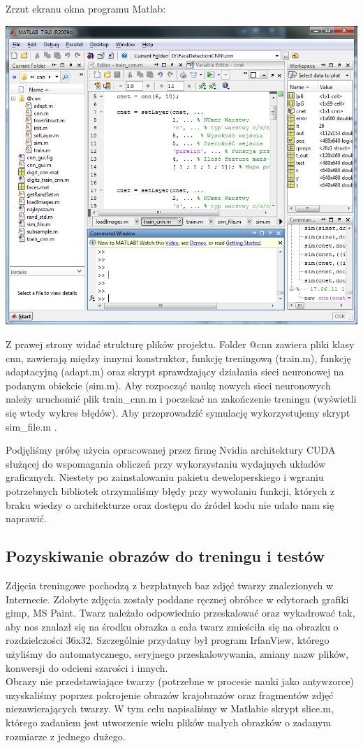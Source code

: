 \documentclass[11pt,a4paper]{article}
\begin{document}
Zrzut ekranu okna programu Matlab:

\vspace*{0.5cm}
\includegraphics[scale=0.5]{matlab}
\vspace*{0.5cm}

Z prawej strony widać strukturę plików projektu. Folder @cnn zawiera pliki klasy cnn, zawierają między innymi konstruktor, funkcję treningową (train.m), funkcję adaptacyjną (adapt.m) oraz skrypt sprawdzający działania sieci neuronowej na podanym obiekcie (sim.m).
\indent
Aby rozpocząć naukę nowych sieci neuronowych należy uruchomić plik train\_cnn.m i poczekać na zakończenie treningu (wyświetli się wtedy wykres błędów). Aby przeprowadzić symulację wykorzystujemy skrypt sim\_file.m .

Podjęliśmy próbę użycia opracowanej przez firmę Nvidia architektury CUDA służącej do wspomagania obliczeń przy wykorzystaniu wydajnych układów graficznych. Niestety po zainstalowaniu pakietu deweloperskiego i wgraniu potrzebnych bibliotek otrzymaliśmy błędy przy wywołaniu funkcji, których z braku wiedzy o architekturze oraz dostępu do źródeł kodu nie udało nam się naprawić.
  

\subsection{Pozyskiwanie obrazów do treningu i testów}
Zdjęcia treningowe pochodzą z bezpłatnych baz zdjęć twarzy znalezionych w Internecie. Zdobyte zdjęcia zostały poddane ręcznej obróbce w edytorach grafiki gimp, MS Paint. Twarz należało odpowiednio przeskalować oraz wykadrować tak, aby nos znalazł się na środku obrazka a cała twarz zmieściła się na obrazku o rozdzielczości 36x32.  Szczególnie przydatny był program IrfanView, którego użyliśmy do automatycznego, seryjnego przeskalowywania, zmiany nazw plików, konwersji do odcieni szarości i innych.\\
\indent
Obrazy nie przedstawiające twarzy (potrzebne w procesie nauki jako antywzorce) uzyskaliśmy poprzez pokrojenie obrazów krajobrazów oraz fragmentów zdjęć niezawierających twarzy. W tym celu napisaliśmy w Matlabie skrypt slice.m, którego zadaniem jest utworzenie wielu plików małych obrazków o zadanym rozmiarze z jednego dużego.
\end{document}
